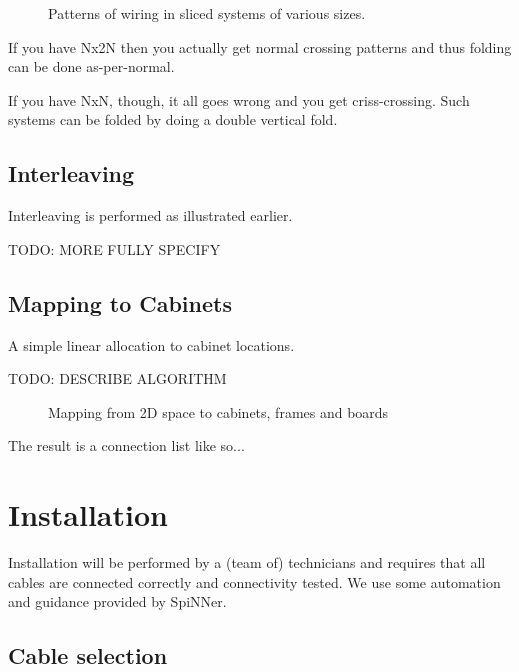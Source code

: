 			\begin{figure}
				\center
				\caption{Patterns of wiring in sliced systems of various sizes.}
				\label{fig:slicedSizes}
			\end{figure}
			
			If you have Nx2N then you actually get normal crossing patterns and thus
			folding can be done as-per-normal.
			
			If you have NxN, though, it all goes wrong and you get criss-crossing.
			Such systems can be folded by doing a double vertical fold.
		
		\subsection{Interleaving}
			
			Interleaving is performed as illustrated earlier.
			
			TODO: MORE FULLY SPECIFY
		
		\subsection{Mapping to Cabinets}
			
			A simple linear allocation to cabinet locations.
			
			TODO: DESCRIBE ALGORITHM
			
			\begin{figure}
				\center
				
				\caption{Mapping from 2D space to cabinets, frames and boards}
				\label{fig:cabinetisation}
			\end{figure}
			
			The result is a connection list like so...
		
	\section{Installation}
		
		Installation will be performed by a (team of) technicians and requires that
		all cables are connected correctly and connectivity tested. We use some
		automation and guidance provided by SpiNNer.
		
		\subsection{Cable selection}
			
